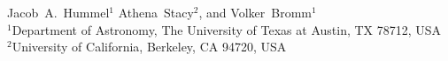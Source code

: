 Jacob~A.~Hummel$^{1}$ Athena~Stacy$^{2}$, and Volker~Bromm$^{1}$\\
$^1$Department of Astronomy, The University of Texas at Austin, TX 78712, USA\\
$^2$University of California, Berkeley, CA 94720, USA